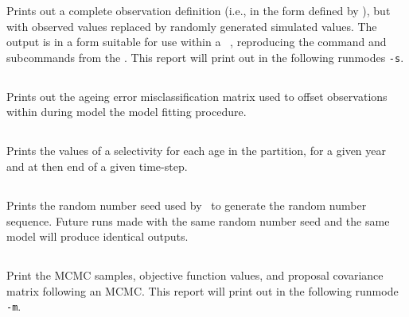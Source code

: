 Prints out a complete observation definition (i.e., in the form defined by ), but with observed values replaced by randomly generated simulated values. The output is in a form  suitable for use within a \CNAME\ \config, reproducing the command and subcommands from the \config. This report will print out in the following runmodes \texttt{-s}.

\subsection{}\label{sec:ageingerrorreport}

Prints out the ageing error misclassification matrix used to offset observations within during model the model fitting procedure.

\subsection{}

Prints the values of a selectivity for each age in the partition, for a given year and at then end of a given time-step.

\subsection{}

Prints the random number seed used by \CNAME\ to generate the random number sequence. Future runs made with the same random number seed and the same model will produce identical outputs.

\subsection{}

Print the MCMC samples, objective function values, and proposal covariance matrix following an MCMC. This report will print out in the following runmode \texttt{-m}.

\subsection{}

